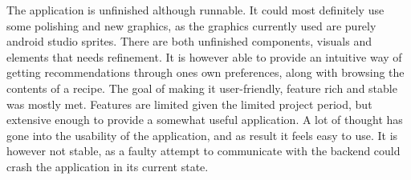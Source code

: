 The application is unfinished although runnable. It could most definitely use some polishing and new graphics, as the graphics currently used are purely android studio sprites. There are both unfinished components, visuals and elements that needs refinement. It is however able to provide an intuitive way of getting recommendations through ones own preferences, along with browsing the contents of a recipe. The goal of making it user-friendly, feature rich and stable was mostly met. Features are limited given the limited project period, but extensive enough to provide a somewhat useful application. A lot of thought has gone into the usability of the application, and as result it feels easy to use. It is however not stable, as a faulty attempt to communicate with the backend could crash the application in its current state.



